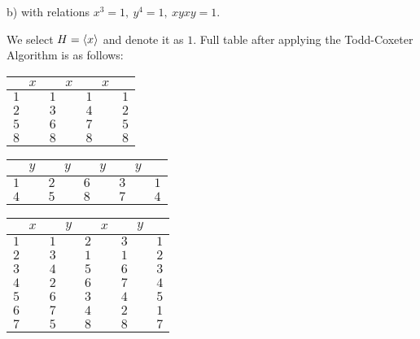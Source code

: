 \documentclass{article}
\theoremstyle{definition}
\DeclarePairedDelimiter\genby{\langle}{\rangle}
\begin{document}
\begin{tcolorbox}
b) with relations $x^3 = 1, \> y^4 = 1, \> xyxy = 1$.
\end{tcolorbox}

We select $H = \genby{x}$ and denote it as $1$.
Full table after applying the Todd-Coxeter Algorithm is as follows:

\begin{center}
    \begin{tabular}{l l l l} 
        \hline
        $\quad \> x$ & $\quad \> x$ & $\quad \> x$ \\
        \hline
        $1$ & $1$ & $1$ & $1$ \\ 
        $2$ & $3$ & $4$ & $2$ \\ 
        $5$ & $6$ & $7$ & $5$ \\
        $8$ & $8$ & $8$ & $8$
        \\\hline
    \end{tabular}
\end{center}

\begin{center}
    \begin{tabular}{l l l l l} 
        \hline
        $\quad \> y$ & $\quad \> y$ & $\quad \> y$ & $\quad \> y$ \\
        \hline
        $1$ & $2$ & $6$ & $3$ & $1$ \\ 
        $4$ & $5$ & $8$ & $7$ & $4$
        \\\hline
    \end{tabular}
\end{center}

\begin{center}
    \begin{tabular}{l l l l l} 
        \hline
        $\quad \> x$ & $\quad \> y$ & $\quad \> x$ & $\quad \> y$ \\
        \hline
        $1$ & $1$ & $2$ & $3$ & $1$ \\ 
        $2$ & $3$ & $1$ & $1$ & $2$ \\ 
        $3$ & $4$ & $5$ & $6$ & $3$ \\ 
        $4$ & $2$ & $6$ & $7$ & $4$ \\ 
        $5$ & $6$ & $3$ & $4$ & $5$ \\ 
        $6$ & $7$ & $4$ & $2$ & $1$ \\ 
        $7$ & $5$ & $8$ & $8$ & $7$ 
        \\\hline
    \end{tabular}
\end{center}
\end{document}
